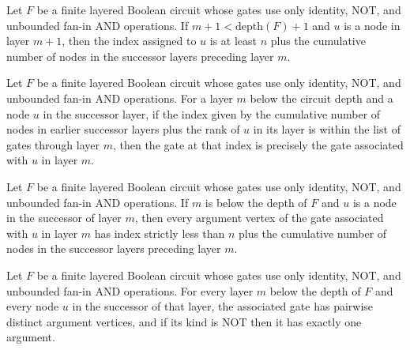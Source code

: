\begin{theorem}
\label{BoolCircuit.LayeredCircuit.layerVertex_ge}
\leanok
{}
Let $F$ be a finite layered Boolean circuit whose gates use only identity, NOT, and
unbounded fan-in AND operations. If $m+1<\mathrm{depth}(F)+1$ and $u$ is a node in layer
$m+1$, then the index assigned to $u$ is at least $n$ plus the cumulative number of
nodes in the successor layers preceding layer $m$.
\end{theorem}

\begin{theorem}
\label{BoolCircuit.LayeredCircuit.gatesUpTo_getElem}
\leanok
{}
Let $F$ be a finite layered Boolean circuit whose gates use only identity, NOT, and
unbounded fan-in AND operations. For a layer $m$ below the circuit depth and a node $u$
in the successor layer, if the index given by the cumulative number of nodes in earlier
successor layers plus the rank of $u$ in its layer is within the list of gates through
layer $m$, then the gate at that index is precisely the gate associated with $u$ in
layer $m$.
\end{theorem}

\begin{theorem}
\label{BoolCircuit.LayeredCircuit.layerGate_args_lt}
\leanok
{}
Let $F$ be a finite layered Boolean circuit whose gates use only identity, NOT, and
unbounded fan-in AND operations. If $m$ is below the depth of $F$ and $u$ is a node in
the successor of layer $m$, then every argument vertex of the gate associated with $u$
in layer $m$ has index strictly less than $n$ plus the cumulative number of nodes in the
successor layers preceding layer $m$.
\end{theorem}

\begin{theorem}
\label{BoolCircuit.LayeredCircuit.layerGate_wellFormed}
\leanok
{}
Let $F$ be a finite layered Boolean circuit whose gates use only identity, NOT, and
unbounded fan-in AND operations. For every layer $m$ below the depth of $F$ and every
node $u$ in the successor of that layer, the associated gate has pairwise distinct
argument vertices, and if its kind is NOT then it has exactly one argument.
\end{theorem}

